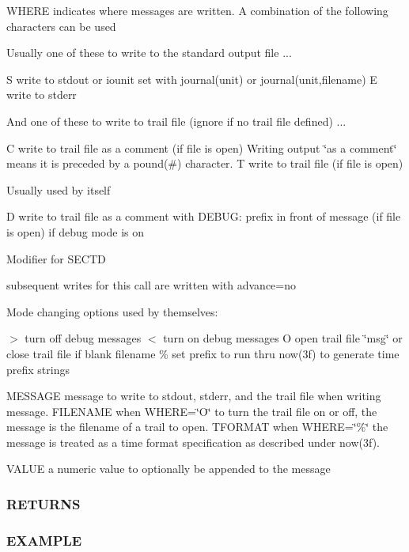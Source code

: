 W\+H\+E\+RE indicates where messages are written. A combination of the following characters can be used

Usually one of these to write to the standard output file ...

S write to stdout or iounit set with journal(unit) or journal(unit,filename) E write to stderr

And one of these to write to trail file (ignore if no trail file defined) ...

C write to trail file as a comment (if file is open) Writing output \char`\"{}as a comment\char`\"{} means it is preceded by a pound(\#) character. T write to trail file (if file is open)

Usually used by itself

D write to trail file as a comment with D\+E\+B\+UG\+: prefix in front of message (if file is open) if debug mode is on

Modifier for S\+E\+C\+TD


\begin{DoxyItemize}
\item subsequent writes for this call are written with advance=\textquotesingle{}no\textquotesingle{}
\end{DoxyItemize}

Mode changing options used by themselves\+:

$>$ turn off debug messages $<$ turn on debug messages O open trail file \char`\"{}msg\char`\"{} or close trail file if blank filename \% set prefix to run thru now(3f) to generate time prefix strings

M\+E\+S\+S\+A\+GE message to write to stdout, stderr, and the trail file when writing message. F\+I\+L\+E\+N\+A\+ME when W\+H\+E\+RE=\char`\"{}\+O\char`\"{} to turn the trail file on or off, the message is the filename of a trail to open. T\+F\+O\+R\+M\+AT when W\+H\+E\+RE=\char`\"{}\%\char`\"{} the message is treated as a time format specification as described under now(3f).

V\+A\+L\+UE a numeric value to optionally be appended to the message

\subsubsection*{R\+E\+T\+U\+R\+NS}

\subsubsection*{E\+X\+A\+M\+P\+LE}

